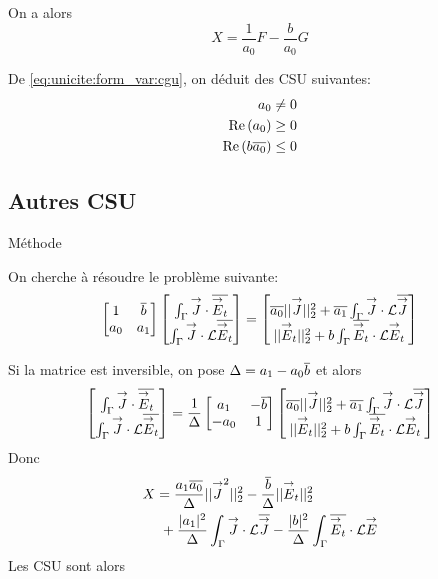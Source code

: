         On a alors
        \begin{equation}
          \label{eq:unicite:form_var:decomp_cgu_ci1_a1_nul}
          X = \frac{1}{a_0}F - \frac{b}{a_0}G
        \end{equation}

        De \eqref{eq:unicite:form_var:cgu}, on déduit des CSU suivantes:
        \begin{align}
          a_0 \not= 0\\
          \operatorname{Re}\left(a_0\right) \ge 0\\
          \operatorname{Re}\left(b{\overline{a_0}}\right) \le 0
        \end{align}

\subsection{Autres CSU}
  Méthode \cite{stupfel_implementation_2015}

  On cherche à résoudre le problème suivante:
  \[
    \begin{bmatrix}
      1 & {\overline{b}} \\
      a_0 & a_1
    \end{bmatrix}
    \begin{bmatrix}
      \int_\Gamma {\overset{\rightarrow}{J}} \cdot {\overline{{\overset{\rightarrow}{E}}_t}} \\
      \int_\Gamma {\overset{\rightarrow}{J}}\cdot \mathcal{L}{\overline{{\overset{\rightarrow}{E}}_t}}
    \end{bmatrix}
    =
    \begin{bmatrix}
      {\overline{a_0}}||{\overset{\rightarrow}{J}}||_2^2 + {\overline{a_1}}\int_\Gamma {\overset{\rightarrow}{J}} \cdot \mathcal{L}{\overline{{\overset{\rightarrow}{J}}}} \\
      ||{\overset{\rightarrow}{E}}_t||_2^2 + b\int_\Gamma {\overline{{\overset{\rightarrow}{E}}_t}} \cdot \mathcal{L}{\overset{\rightarrow}{E}}_t
    \end{bmatrix}
  \]

  Si la matrice est inversible, on pose \(\Delta = a_1 - a_0{\overline{b}}\) et alors
  \[
  \begin{bmatrix}
    \int_\Gamma {\overset{\rightarrow}{J}} \cdot {\overline{{\overset{\rightarrow}{E}}_t}} \\
    \int_\Gamma {\overset{\rightarrow}{J}}\cdot \mathcal{L}{\overline{{\overset{\rightarrow}{E}}_t}}
  \end{bmatrix}
  =\dfrac{1}{\Delta}
  \begin{bmatrix}
    a_1 & -{\overline{b}} \\
    -a_0 & 1
  \end{bmatrix}
  \begin{bmatrix}
    {\overline{a_0}}||{\overset{\rightarrow}{J}}||_2^2 + {\overline{a_1}}\int_\Gamma {\overset{\rightarrow}{J}} \cdot \mathcal{L}{\overline{{\overset{\rightarrow}{J}}}} \\
    ||{\overset{\rightarrow}{E}}_t||_2^2 + b\int_\Gamma {\overline{{\overset{\rightarrow}{E}}_t}} \cdot \mathcal{L}{\overset{\rightarrow}{E}}_t
  \end{bmatrix}
  \]
  Donc
  \begin{align*}
    X &=  \dfrac{a_1{\overline{a_0}}}{\Delta}||{\overset{\rightarrow}{J}}^2||_2^2 - \dfrac{{\overline{b}}}{\Delta}||{\overset{\rightarrow}{E}}_t||_2^2 \\
    &~+\dfrac{|a_1|^2}{\Delta}\int_\Gamma{\overset{\rightarrow}{J}}\cdot \mathcal{L} {\overline{{\overset{\rightarrow}{J}}}} - \dfrac{|b|^2}{\Delta}\int_\Gamma{\overline{{\overset{\rightarrow}{E}}_t}}\cdot \mathcal{L}{\overset{\rightarrow}{E}}
  \end{align*}
  Les CSU sont alors

